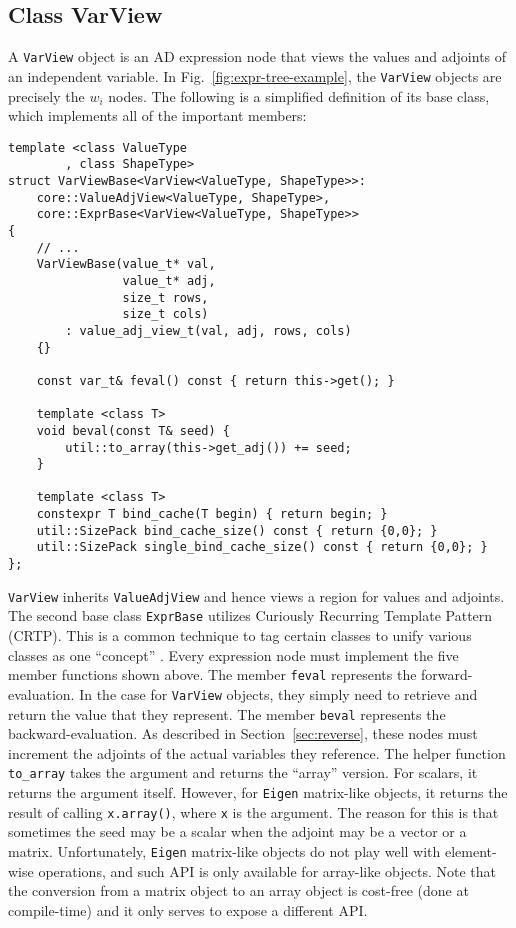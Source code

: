 \subsection{Class VarView}\label{ssec:var_view}

A \verb|VarView| object is an AD expression node
that views the values and adjoints of an independent variable.
In Fig.~\ref{fig:expr-tree-example}, the \verb|VarView| objects are precisely the $w_i$ nodes.
The following is a simplified definition of its base class, 
which implements all of the important members:
\begin{lstlisting}[style=customcpp]
template <class ValueType
        , class ShapeType>
struct VarViewBase<VarView<ValueType, ShapeType>>:
    core::ValueAdjView<ValueType, ShapeType>,
    core::ExprBase<VarView<ValueType, ShapeType>>
{
    // ...
    VarViewBase(value_t* val,
                value_t* adj,
                size_t rows,
                size_t cols)
        : value_adj_view_t(val, adj, rows, cols)
    {}

    const var_t& feval() const { return this->get(); }

    template <class T>
    void beval(const T& seed) { 
        util::to_array(this->get_adj()) += seed; 
    }

    template <class T>
    constexpr T bind_cache(T begin) { return begin; }
    util::SizePack bind_cache_size() const { return {0,0}; }
    util::SizePack single_bind_cache_size() const { return {0,0}; }
};
\end{lstlisting}

\verb|VarView| inherits \verb|ValueAdjView| and hence views
a region for values and adjoints.
The second base class \verb|ExprBase| utilizes Curiously Recurring Template Pattern (CRTP).
This is a common technique to tag certain classes to unify various classes as one ``concept''
.
Every expression node must implement the five member functions shown above.
The member \verb|feval| represents the forward-evaluation.
In the case for \verb|VarView| objects, 
they simply need to retrieve and return the value that they represent.
The member \verb|beval| represents the backward-evaluation.
As described in Section~\ref{sec:reverse}, 
these nodes must increment the adjoints of the actual variables they reference.
The helper function \verb|to_array| takes the argument and returns the ``array'' version.
For scalars, it returns the argument itself.
However, for \verb|Eigen| matrix-like objects, 
it returns the result of calling \verb|x.array()|, where \verb|x| is the argument.
The reason for this is that sometimes the seed may be a scalar
when the adjoint may be a vector or a matrix.
Unfortunately, \verb|Eigen| matrix-like objects do not play well with element-wise operations,
and such API is only available for array-like objects.
Note that the conversion from a matrix object to an array object 
is cost-free (done at compile-time) and it only serves to expose a different API.\@

